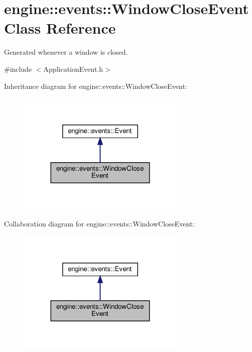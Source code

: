 \hypertarget{classengine_1_1events_1_1WindowCloseEvent}{}\section{engine\+:\+:events\+:\+:Window\+Close\+Event Class Reference}
\label{classengine_1_1events_1_1WindowCloseEvent}


Generated whenever a window is closed.  




{\ttfamily \#include $<$Application\+Event.\+h$>$}



Inheritance diagram for engine\+:\+:events\+:\+:Window\+Close\+Event\+:\nopagebreak
\begin{figure}[H]
\begin{center}
\leavevmode
\includegraphics[width=227pt]{classengine_1_1events_1_1WindowCloseEvent__inherit__graph}
\end{center}
\end{figure}


Collaboration diagram for engine\+:\+:events\+:\+:Window\+Close\+Event\+:\nopagebreak
\begin{figure}[H]
\begin{center}
\leavevmode
\includegraphics[width=227pt]{classengine_1_1events_1_1WindowCloseEvent__coll__graph}
\end{center}
\end{figure}
